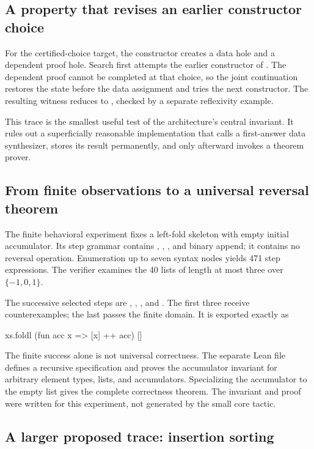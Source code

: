 \documentclass[11pt,letterpaper]{article}
\newcommand{\id}[1]{\texttt{\detokenize{#1}}}
\theoremstyle{definition}
\theoremstyle{remark}
\begin{document}
\subsection{A property that revises an earlier constructor choice}

For the certified-choice target, the constructor creates a data hole and a dependent proof hole. Search first attempts the earlier constructor of \id{Choice}. The dependent proof cannot be completed at that choice, so the joint continuation restores the state before the data assignment and tries the next constructor. The resulting witness reduces to \id{Choice.second}, checked by a separate reflexivity example.

This trace is the smallest useful test of the architecture's central invariant. It rules out a superficially reasonable implementation that calls a first-answer data synthesizer, stores its result permanently, and only afterward invokes a theorem prover.

\subsection{From finite observations to a universal reversal theorem}

The finite behavioral experiment fixes a left-fold skeleton with empty initial accumulator. Its step grammar contains \id{acc}, \id{[]}, \id{[x]}, and binary append; it contains no reversal operation. Enumeration up to seven syntax nodes yields 471 step expressions. The verifier examines the 40 lists of length at most three over $\{-1,0,1\}$.

The successive selected steps are \id{acc}, \id{[x]}, \id{acc ++ [x]}, and \id{[x] ++ acc}. The first three receive counterexamples; the last passes the finite domain. It is exported exactly as
\begin{code}
xs.foldl (fun acc x => [x] ++ acc) []
\end{code}
The finite success alone is not universal correctness. The separate Lean file defines a recursive specification and proves the accumulator invariant for arbitrary element types, lists, and accumulators. Specializing the accumulator to the empty list gives the complete correctness theorem. The invariant and proof were written for this experiment, not generated by the small core tactic.

\subsection{A larger proposed trace: insertion sorting}
\end{document}
